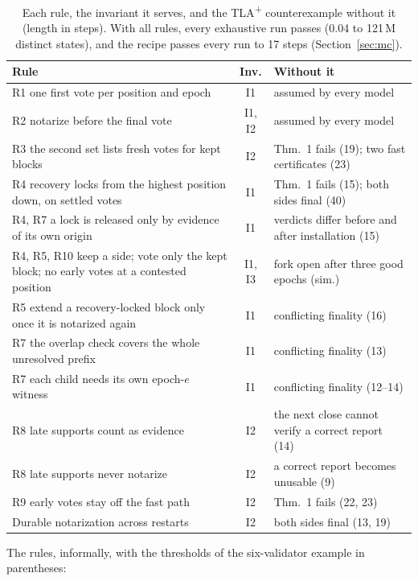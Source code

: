 \begin{table}[t]
\caption{Each rule, the invariant it serves, and the TLA\textsuperscript{+} counterexample without it (length in steps). With all rules, every exhaustive run passes (0.04 to 121\,M distinct states), and the recipe passes every run to 17 steps (Section~\ref{sec:mc}).}
\label{tab:rules}
\centering
\footnotesize
\setlength{\tabcolsep}{2.5pt}
\renewcommand{\arraystretch}{1.08}
\begin{tabularx}{\columnwidth}{@{}>{\raggedright\arraybackslash}X c >{\raggedright\arraybackslash}p{}@{}}
\toprule
Rule & Inv. & Without it \\
\midrule
R1 one first vote per position and epoch & I1 & assumed by every model \\
R2 notarize before the final vote & I1, I2 & assumed by every model \\
R3 the second set lists fresh votes for kept blocks & I2 & Thm.~1 fails (19); two fast certificates (23) \\
R4 recovery locks from the highest position down, on settled votes & I1 & Thm.~1 fails (15); both sides final (40) \\
R4, R7 a lock is released only by evidence of its own origin & I1 & verdicts differ before and after installation (15) \\
R4, R5, R10 keep a side; vote only the kept block; no early votes at a contested position & I1, I3 & fork open after three good epochs (sim.) \\
R5 extend a recovery-locked block only once it is notarized again & I1 & conflicting finality (16) \\
R7 the overlap check covers the whole unresolved prefix & I1 & conflicting finality (13) \\
R7 each child needs its own epoch-$e$ witness & I1 & conflicting finality (12--14) \\
R8 late supports count as evidence & I2 & the next close cannot verify a correct report (14) \\
R8 late supports never notarize & I2 & a correct report becomes unusable (9) \\
R9 early votes stay off the fast path & I2 & Thm.~1 fails (22, 23) \\
Durable notarization across restarts & I2 & both sides final (13, 19) \\
\bottomrule
\end{tabularx}
\end{table}

The rules, informally, with the thresholds of the six-validator example in parentheses:

